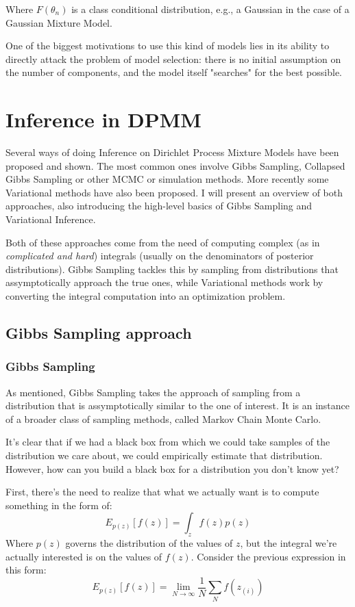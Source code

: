 \documentclass[11pt]{article}
\begin{document}
Where \(F(\theta_n)\) is a class conditional distribution, e.g., a
Gaussian in the case of a Gaussian Mixture Model.
	
One of the biggest motivations to use this kind of models lies in its
ability to directly attack the problem of model selection: there is no
initial assumption on the number of components, and the model itself
"searches" for the best possible.
	

\section{Inference in DPMM}\label{inference-in-dpmm}
	
Several ways of doing Inference on Dirichlet Process Mixture Models have
been proposed and shown. The most common ones involve Gibbs Sampling,
Collapsed Gibbs Sampling or other MCMC or simulation methods. More
recently some Variational methods have also been proposed. I will
present an overview of both approaches, also introducing the high-level
basics of Gibbs Sampling and Variational Inference.
	
Both of these approaches come from the need of computing complex (as in
\emph{complicated and hard}) integrals (usually on the denominators of
posterior distributions). Gibbs Sampling tackles this by sampling from
distributions that assymptotically approach the true ones, while
Variational methods work by converting the integral computation into an
optimization problem.
	
\subsection{Gibbs Sampling approach}\label{gibbs-sampling-approach}
\subsubsection{Gibbs Sampling}\label{gibbs-sampling}
	
As mentioned, Gibbs Sampling takes the approach of sampling from a
distribution that is assymptotically similar to the one of interest. It
is an instance of a broader class of sampling methods, called Markov
Chain Monte Carlo.
	
It's clear that if we had a black box from which we could take samples
of the distribution we care about, we could empirically estimate that
distribution. However, how can you build a black box for a distribution
you don't know yet?
	
First, there's the need to realize that what we actually want is to
compute something in the form of: \[E_{p(z)}[f(z)]=\int_{z}f(z)p(z)\]
Where \(p(z)\) governs the distribution of the values of \(z\), but the
integral we're actually interested is on the values of \(f(z)\).
Consider the previous expression in this form:
\[E_{p(z)}[f(z)]=\lim_{N \to \infty}\frac{1}{N}\sum_{N}f(z_{(i)})\]
	
\end{document}
